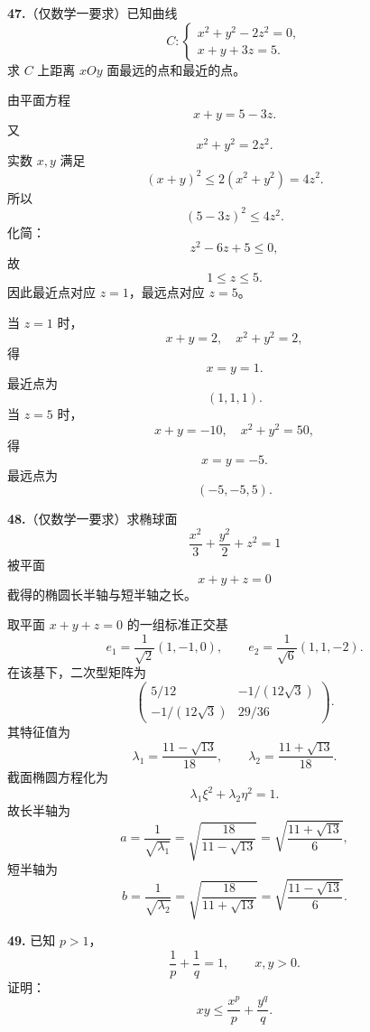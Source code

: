 \begin{problemblock}
\textbf{47.}（仅数学一要求）已知曲线
\[
C:\begin{cases}
x^2+y^2-2z^2=0,\\
x+y+3z=5.
\end{cases}
\]
求 \(C\) 上距离 \(xOy\) 面最远的点和最近的点。
\end{problemblock}

\begin{solutionblock}
由平面方程
\[
x+y=5-3z.
\]
又
\[
x^2+y^2=2z^2.
\]
实数 \(x,y\) 满足
\[
(x+y)^2\le2(x^2+y^2)=4z^2.
\]
所以
\[
(5-3z)^2\le4z^2.
\]
化简：
\[
z^2-6z+5\le0,
\]
故
\[
1\le z\le5.
\]
因此最近点对应 \(z=1\)，最远点对应 \(z=5\)。

当 \(z=1\) 时，
\[
x+y=2,\quad x^2+y^2=2,
\]
得
\[
x=y=1.
\]
最近点为
\[
\boxed{(1,1,1)}.
\]
当 \(z=5\) 时，
\[
x+y=-10,\quad x^2+y^2=50,
\]
得
\[
x=y=-5.
\]
最远点为
\[
\boxed{(-5,-5,5)}.
\]
\end{solutionblock}

\begin{problemblock}
\textbf{48.}（仅数学一要求）求椭球面
\[
\frac{x^2}{3}+\frac{y^2}{2}+z^2=1
\]
被平面
\[
x+y+z=0
\]
截得的椭圆长半轴与短半轴之长。
\end{problemblock}

\begin{solutionblock}
取平面 \(x+y+z=0\) 的一组标准正交基
\[
e_1=\frac{1}{\sqrt2}(1,-1,0),\qquad
e_2=\frac{1}{\sqrt6}(1,1,-2).
\]
在该基下，二次型矩阵为
\[
\begin{pmatrix}
5/12&-1/(12\sqrt3)\\
-1/(12\sqrt3)&29/36
\end{pmatrix}.
\]
其特征值为
\[
\lambda_1=\frac{11-\sqrt{13}}{18},\qquad
\lambda_2=\frac{11+\sqrt{13}}{18}.
\]
截面椭圆方程化为
\[
\lambda_1 \xi^2+\lambda_2\eta^2=1.
\]
故长半轴为
\[
a=\frac1{\sqrt{\lambda_1}}
=\sqrt{\frac{18}{11-\sqrt{13}}}
=\boxed{\sqrt{\frac{11+\sqrt{13}}{6}}},
\]
短半轴为
\[
b=\frac1{\sqrt{\lambda_2}}
=\sqrt{\frac{18}{11+\sqrt{13}}}
=\boxed{\sqrt{\frac{11-\sqrt{13}}{6}}}.
\]
\end{solutionblock}

\begin{problemblock}
\textbf{49.} 已知 \(p>1\)，
\[
\frac1p+\frac1q=1,\qquad x,y>0.
\]
证明：
\[
xy\le \frac{x^p}{p}+\frac{y^q}{q}.
\]
\end{problemblock}

